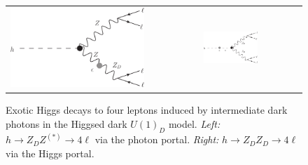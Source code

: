 \begin{figure}
\begin{center}
\begin{tabular}{ccc}
\includegraphics[width=0.4 \textwidth]{section9/plots/feynmandiagram_hzzd}
& \hspace{4mm} &
\includegraphics[width=0.4\textwidth]{section9/plots/feynmandiagram_hzdzd}
\end{tabular}
\end{center}
\caption{ Exotic Higgs decays to four leptons induced by intermediate
  dark photons in the Higgsed dark $U(1)_D$ model. \emph{Left:} $h\to Z_D
  Z^{(*)} \to 4\ell$ via the photon portal. \emph{Right:} $h \to Z_D Z_D
  \to 4\ell$ via the Higgs portal. }
\label{f.ZDfeynman}
\end{figure}




